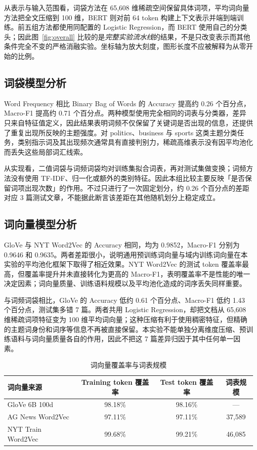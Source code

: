 \documentclass[UTF8,a4paper,10pt]{ctexart}
\begin{document}
\begin{samepage}
从表示与输入范围看，词袋方法在 65,608 维稀疏空间保留具体词项，平均词向量方法把全文压缩到 100 维，BERT 则对前 64 token 构建上下文表示并端到端训练。前五组方法都使用同配置的 Logistic Regression，而 BERT 使用自己的分类头；因此图~\ref{fig:overall} 比较的是\emph{完整实验流水线}的结果，不是只改变表示而其他条件完全不变的严格消融实验。坐标轴为放大刻度，图形长度不应被解释为从零开始的比例。
\end{samepage}

\subsection{词袋模型分析}

Word Frequency 相比 Binary Bag of Words 的 Accuracy 提高约 0.26 个百分点，Macro-F1 提高约 0.71 个百分点。两种模型使用完全相同的词表与分类器，差异只来自特征值定义，因此结果表明词频不仅保留了关键词是否出现的信息，还提供了重复出现所反映的主题强度。对 politics、business 与 sports 这类主题分类任务，类别指示词及其出现频次通常具有直接判别力，稀疏高维表示没有因平均池化而丢失这些局部词汇线索。

从实现看，二值词袋与词频词袋均对训练集拟合词表，再对测试集做变换；词频方法没有使用 TF-IDF、归一化或额外的类别特征。因此本组比较主要反映「是否保留词项出现次数」的作用。不过只进行了一次固定划分，约 0.26 个百分点的差距对应 3 篇测试文章，不能据此断言该差距在其他随机划分上稳定成立。

\subsection{词向量模型分析}

GloVe 与 NYT Word2Vec 的 Accuracy 相同，均为 0.9852，Macro-F1 分别为 0.9646 和 0.9635。两者差距很小，说明通用预训练词向量与域内训练词向量在本实验的平均池化框架下取得了相近效果。NYT Word2Vec 的测试 token 覆盖率最高，但覆盖率提升并未直接转化为更高的 Macro-F1，表明覆盖率不是性能的唯一决定因素；词向量质量、训练语料规模以及平均池化造成的词序丢失同样重要。

与词频词袋相比，GloVe 的 Accuracy 低约 0.61 个百分点、Macro-F1 低约 1.43 个百分点，测试集多错 7 篇。两者共用 Logistic Regression，却把文档从 65,608 维稀疏词项特征变为 100 维平均词向量；这种压缩有利于使用稠密特征，但精确的主题词身份和词序等信息不再被直接保留。本实验不能单独分离维度压缩、预训练语料与词向量质量各自的作用，因此不把这 7 篇差异归因于其中任何单一因素。

\begin{table}[H]
  \centering
  \caption{词向量覆盖率与词表规模}
  \label{tab:coverage}
  \begin{tabular}{lccc}
    \toprule
    词向量来源 & Training token 覆盖率 & Test token 覆盖率 & 词表规模 \\
    \midrule
    GloVe 6B 100d       & 98.18\% & 98.16\% & --- \\
    AG News Word2Vec    & 97.11\% & 97.11\% & 37,589 \\
    NYT Train Word2Vec  & 99.68\% & 99.21\% & 46,085 \\
    \bottomrule
  \end{tabular}
\end{table}
\end{document}
